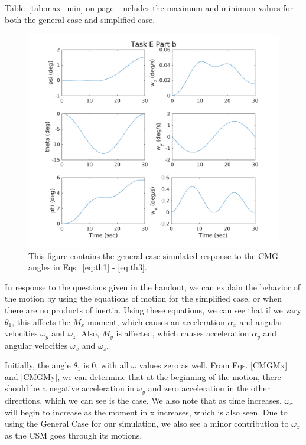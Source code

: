 \documentclass{article}
\begin{document}
Table~\ref{tab:max_min} on page~\pageref{tab:max_min} includes the maximum and minimum values for both the general case and simplified case.

\begin{figure}[H]
  \includegraphics[width=\linewidth]{task_e_part_b.png}
  \caption{This figure contains the general case simulated response to the CMG angles in Eqs.~\ref{eq:th1} - \ref{eq:th3}.}
  \label{fig:taske_b}
\end{figure}

In response to the questions given in the handout, we can explain the behavior of the motion by using the equations of motion for the simplified case, or when there are no products of inertia. Using these equations, we can see that if we vary $\theta_1$, this affects the $M_x$ moment, which causes an acceleration $\alpha_x$ and angular velocities $\omega_y$ and $\omega_z$. Also, $M_y$ is affected, which causes acceleration $\alpha_y$ and angular velocities $\omega_x$ and $\omega_z$. 

Initially, the angle $\theta_1$ is 0, with all $\omega$ values zero as well. From Eqs. \ref{CMGMx} and \ref{CMGMy}, we can determine that at the beginning of the motion, there should be a negative acceleration in $\omega_y$ and zero acceleration in the other directions, which we can see is the case. We also note that as time increases, $\omega_x$ will begin to increase as the moment in x increases, which is also seen. Due to using the General Case for our simulation, we also see a minor contribution to $\omega_z$ as the CSM goes through its motions.
\end{document}
